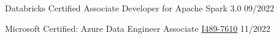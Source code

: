 
\begin{cvhonors}
	\cvhonor
	{Databricks Certified Associate Developer for Apache Spark 3.0}
	{\href{https://credentials.databricks.com/46ebd6b9-974a-4ecc-9cba-c69cc89deaa2}{\faLink{}}}
	{}
	{09/2022}
	
	\cvhonor
	{Microsoft Certified: Azure Data Engineer Associate}
	{\href{https://www.credly.com/badges/a20158bd-d8a5-43fd-9b98-c32b26fd9dee}{\faLink\acvHeaderIconSep I489-7610}}
	{}
	{11/2022}
	
\end{cvhonors}